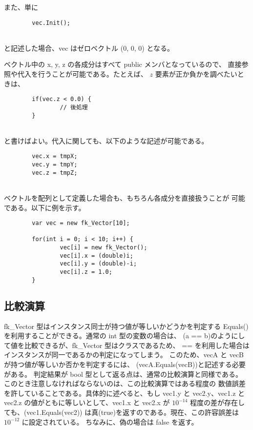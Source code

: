 また、単に
\\
\begin{screen}
\begin{verbatim}
        vec.Init();
\end{verbatim}
\end{screen}
~ \\
と記述した場合、vec はゼロベクトル (0, 0, 0) となる。

ベクトル中の x, y, z の各成分はすべて public メンバとなっているので、
直接参照や代入を行うことが可能である。たとえば、
\(z\) 要素が正か負かを調べたいときは、
\\
\begin{screen}
\begin{verbatim}
        if(vec.z < 0.0) {
                // 後処理
        }
\end{verbatim}
\end{screen}
~ \\
と書けばよい。代入に関しても、以下のような記述が可能である。
\\
\begin{screen}
\begin{verbatim}
        vec.x = tmpX;
        vec.y = tmpY;
        vec.z = tmpZ;
\end{verbatim}
\end{screen}
~ \\
ベクトルを配列として定義した場合も、もちろん各成分を直接扱うことが
可能である。以下に例を示す。
\\
\begin{screen}
\begin{verbatim}
        var vec = new fk_Vector[10];

        for(int i = 0; i < 10; i++) {
                vec[i] = new fk_Vector();
                vec[i].x = (double)i;
                vec[i].y = (double)-i;
                vec[i].z = 1.0;
        }
\end{verbatim}
\end{screen}
\subsection{比較演算}
fk\_Vector 型はインスタンス同士が持つ値が等しいかどうかを判定する 
Equals() を利用することができる。通常の int 型の変数の場合は、
(a == b)のようにして値を比較できるが、fk\_Vector 型はクラスであるため、
== を利用した場合はインスタンスが同一であるかの判定になってしまう。
このため、vecA と vecB が持つ値が等しいか否かを判定するには、
(vecA.Equals(vecB))と記述する必要がある。
判定結果が bool 型として返る点は、通常の比較演算と同様である。
このとき注意しなければならないのは、この比較演算ではある程度の
数値誤差を許していることである。具体的に述べると、もし vec1.y
と vec2.y、vec1.z と vec2.z の値がともに等しいとして、vec1.x
と vec2.x が \(10^{-14}\) 程度の差が存在しても、(vec1.Equals(vec2))
は真(true)を返すのである。現在、この許容誤差は \(10^{-12}\) に設定されている。
ちなみに、偽の場合は false を返す。
